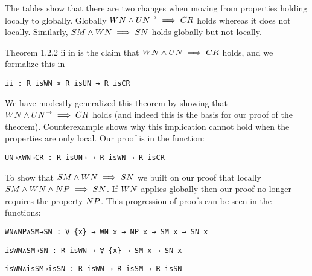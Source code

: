 
The tables show that there are two changes when moving from properties holding locally to globally. 
Globally $\WN \land \UNto \implies \CR$ holds whereas it does not locally. Similarly, $\SM \land \WN \implies \SN$ holds 
globally but not locally. 

Theorem 1.2.2 ii in \terese is the claim that $\WN \land \UN \implies \CR$ holds, and we formalize this in

\verb|ii : R isWN × R isUN → R isCR| \footnotemark[3]

We have modestly generalized this theorem by showing that $\WN \land \UNto \implies \CR$ holds (and indeed this is the basis for our proof of the theorem). 
Counterexample  shows why this implication cannot hold when the properties are only local. Our proof is in the function:

\verb|UN→∧WN→CR : R isUN→ → R isWN → R isCR| \footnotemark[1]

To show that $\SM \land \WN \implies \SN$ we built on our proof that locally $\SM \land \WN \land \NP \implies \SN$. If $\WN$ applies 
globally then our proof no longer requires the property $\NP$. This progression of proofs can be seen in the functions:

\verb|WN∧NP∧SM→SN : ∀ {x} → WN x → NP x → SM x → SN x| 

\verb|isWN∧SM→SN : R isWN → ∀ {x} → SM x → SN x|

\verb|isWN∧isSM→isSN : R isWN → R isSM → R isSN| \footnotemark[1]